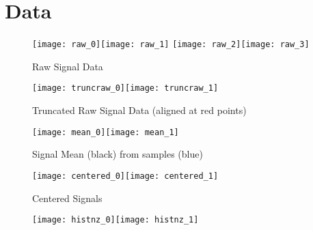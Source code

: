 \documentclass{article}
\begin{document}
	
\section{Data}

\begin{figure}
	\centering
	\texttt{[image: raw\_0]}\texttt{[image: raw\_1]}
	\texttt{[image: raw\_2]}\texttt{[image: raw\_3]}
	\caption{Raw Signal Data}
	\label{fig:raw0}
\end{figure}
%

%
\begin{figure}
	\centering
	\texttt{[image: truncraw\_0]}\texttt{[image: truncraw\_1]}
	\caption{Truncated Raw Signal Data (aligned at red points)}
	\label{fig:truncraw0}
\end{figure}

\begin{figure}
	\centering
	\texttt{[image: mean\_0]}\texttt{[image: mean\_1]}
	\caption{Signal Mean (black) from samples (blue)}
	\label{fig:mean0}
\end{figure}

\begin{figure}
	\centering
	\texttt{[image: centered\_0]}\texttt{[image: centered\_1]}
	\caption{Centered Signals}
	\label{fig:centered0}
\end{figure}
%


\begin{figure}
	\centering
	\texttt{[image: histnz\_0]}\texttt{[image: histnz\_1]}
	\caption{}
	\label{fig:histnz0}
\end{figure}
\end{document}
